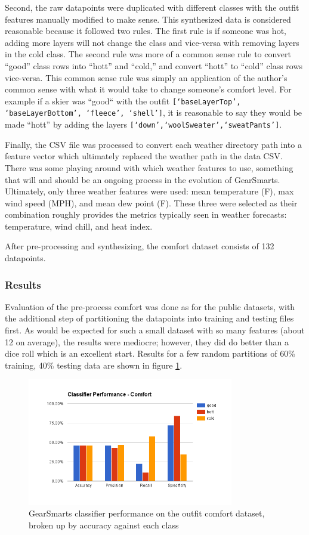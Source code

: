 Second, the raw datapoints were duplicated with different classes with the outfit features manually modified to make sense.
This synthesized data is considered reasonable because it followed two rules. The first rule is if someone was hot, adding
more layers will not change the class and vice-versa with removing layers in the cold class. The second rule was more of a
common sense rule to convert ``good'' class rows into ``hott'' and ``cold,'' and convert ``hott'' to ``cold'' class rows
vice-versa. This common sense rule was simply an application of the author's common sense with what it would take to
change someone's comfort level. For example if a skier was ``good`` with the outfit \texttt{[`baseLayerTop', `baseLayerBottom', `fleece', `shell']},
it is reasonable to say they would be made ``hott'' by adding the layers \texttt{[`down',`woolSweater',`sweatPants']}.

Finally, the CSV file was processed to convert each weather directory path into a feature vector which ultimately replaced the
weather path in the data CSV. There was some playing around with which weather features to use, something that will and should
be an ongoing process in the evolution of GearSmarts. Ultimately, only three weather features were used: mean temperature (F),
max wind speed (MPH), and mean dew point (F). These three were selected as their combination roughly provides the metrics
typically seen in weather forecasts: temperature, wind chill, and heat index.

After pre-processing and synthesizing, the comfort dataset consists of 132 datapoints.

\subsubsection{Results}
\label{subsection:preprocessing}
Evaluation of the pre-process comfort was done as for the public datasets, with the additional step of partitioning the
datapoints into training and testing files first. As would be expected for such a small dataset with so many features
(about 12 on average), the results were mediocre; however, they did do better than a dice roll which is an excellent start.
Results for a few random partitions of 60\% training, 40\% testing data are shown in figure \ref{fig:comfort}.

\begin{figure}[ht!]
    \centering
    \includegraphics[width=90mm]{img/comfort.png}
    \caption{GearSmarts classifier performance on the outfit comfort dataset, broken up by accuracy against each class}
    \label{fig:comfort}
\end{figure}
